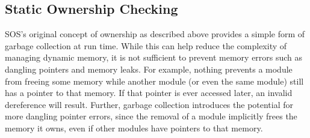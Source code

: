 % 
% 




\subsection{Static Ownership Checking}

SOS's original concept of ownership as described above
provides a simple form of
garbage collection at run time.
While this can help
reduce the complexity of managing
dynamic memory, it is not sufficient to
prevent memory errors such as dangling pointers and memory leaks.
For example, nothing prevents a module from freeing some memory while
another module (or even the same module) still has a pointer to that
memory.  If that pointer is ever accessed later, an invalid dereference
will result.  Further, garbage collection introduces the potential for
more dangling pointer errors, since the removal of a module implicitly
frees the memory it owns, even if other modules have pointers to that
memory.


